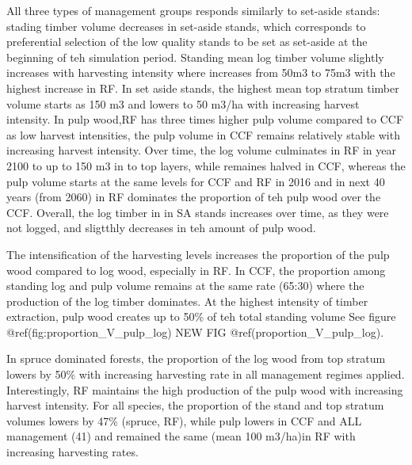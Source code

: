 \documentclass[]{elsarticle} %
\begin{document}
All three types of management groups responds similarly to set-aside stands: stading timber volume decreases in set-aside stands, which corresponds to preferential selection of the low quality stands to be set as set-aside at the beginning of teh simulation period. Standing mean log timber volume slightly increases with harvesting intensity where increases from 50m3 to 75m3 with the highest increase in RF. In set aside stands, the highest mean top stratum timber volume starts as 150 m3 and lowers to 50 m3/ha with increasing harvest intensity. In pulp wood,RF has three times higher pulp volume compared to CCF as low harvest intensities, the pulp volume in CCF remains relatively stable with increasing harvest intensity. Over time, the log volume culminates in RF in year 2100 to up to 150 m3 in to top layers, while remaines halved in CCF, whereas the pulp volume starts at the same levels for CCF and RF in 2016 and in next 40 years (from 2060) in RF dominates the proportion of teh pulp wood over the CCF. Overall, the log timber in in SA stands increases over time, as they were not logged, and sligtthly decreases in teh amount of pulp wood.

The intensification of the harvesting levels increases the proportion of the pulp wood compared to log wood, especially in RF. In CCF, the proportion among standing log and pulp volume remains at the same rate (65:30) where the production of the log timber dominates. At the highest intensity of timber extraction, pulp wood creates up to 50\% of teh total standing volume See figure @ref(fig:proportion\_V\_pulp\_log) NEW FIG @ref(proportion\_V\_pulp\_log).

In spruce dominated forests, the proportion of the log wood from top stratum lowers by 50\% with increasing harvesting rate in all management regimes applied. Interestingly, RF maintains the high production of the pulp wood with increasing harvest intensity. For all species, the proportion of the stand and top stratum volumes lowers by 47\% (spruce, RF), while pulp lowers in CCF and ALL management (41) and remained the same (mean 100 m3/ha)in RF with increasing harvesting rates.
\end{document}
